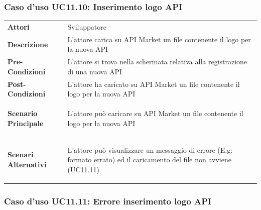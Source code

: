 \subsubsection{Caso d'uso UC11.10: Inserimento logo API}
\label{UC11_10}

\begin{minipage}{\linewidth}
	\begin{tabular}{ l | p{11cm}}
		\hline
		\rowcolor{Gray}
		\multicolumn{2}{c}{UC11.10 - Inserimento logo API} \\
		\hline
		\textbf{Attori} & Sviluppatore \\
		\textbf{Descrizione} & L'attore carica su API Market un file contenente il logo per la nuova API \\
		\textbf{Pre-Condizioni} & L'attore si trova nella schermata relativa alla registrazione di una nuova API \\
		\textbf{Post-Condizioni} & L'attore ha caricato su API Market un file contenente il logo per la nuova API \\
		\textbf{Scenario Principale} & 
		\begin{enumerate*}[label=(\arabic*.),itemjoin={\newline}]
			\item L'attore può caricare su API Market un file contenente il logo per la nuova API
		\end{enumerate*}\\
		\textbf{Scenari Alternativi} & 
		\begin{enumerate*}[label=(\arabic*.),itemjoin={\newline}]
		\item L'attore può visualizzare un messaggio di errore (E.g: formato errato) ed il caricamento del file non avviene (UC11.11)
		\end{enumerate*}\\
	\end{tabular}
\end{minipage}

\subsubsection{Caso d'uso UC11.11: Errore inserimento logo API}
\label{UC11_11}

